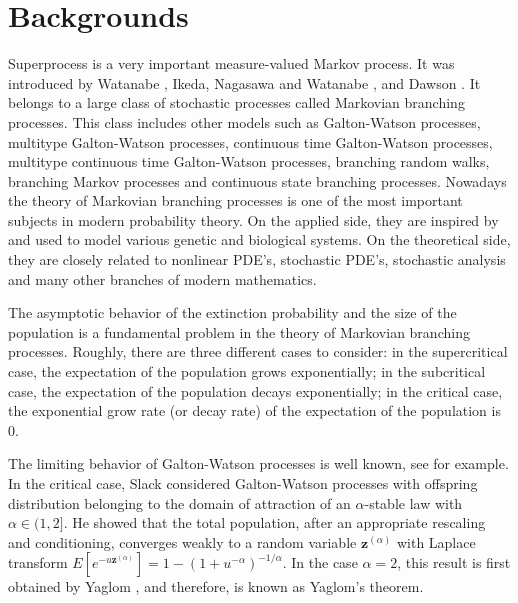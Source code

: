 \documentclass[UTF8]{pkuthss}
\theoremstyle{plain}
\theoremstyle{definition}
\numberwithin{equation}{section}
\begin{document}
\section{Backgrounds}
    Superprocess is a very important measure-valued Markov process. 
    It was introduced by Watanabe \cite{Watanabe1968A-limit}, Ikeda, Nagasawa and Watanabe \cite{IkedaNagasawaWatanabe1968Branching1,IkedaNagasawaWatanabe1968Branching2,IkedaNagasawaWatanabe1968Branching3}, and Dawson \cite{Dawson1975Stochastic,Dawson1977The-critical}. 
    It belongs to a large class of stochastic processes called Markovian branching processes. 
    This class includes other models such as Galton-Watson processes, multitype Galton-Watson processes, continuous time Galton-Watson processes, multitype continuous time Galton-Watson processes, branching random walks, branching Markov processes and continuous state branching processes.
    Nowadays the theory of Markovian branching processes is one of the most important subjects in modern probability theory.
    On the applied side, they are inspired by and used to model various genetic and biological systems. 
    On the theoretical side, they are closely related to nonlinear PDE's, stochastic PDE's, stochastic analysis and many other branches of modern mathematics.

    The asymptotic behavior of the extinction probability and the size of the population is a fundamental problem in the theory of Markovian branching processes. 
    Roughly, there are three different cases to consider: in the supercritical case, the expectation of the population grows exponentially; in the subcritical case, the expectation of the population decays exponentially; in the critical case, the exponential grow rate (or decay rate) of the expectation of the population is $0$.

    The limiting behavior of Galton-Watson processes is well known, see \cite{AthreyaNey1972Branching} for example. 
    In the critical case, Slack \cite{Slack1968A-branching} considered Galton-Watson processes with offspring distribution belonging to the domain of attraction of an $\alpha$-stable law with $\alpha \in (1,2]$. 
    He showed that the total population, after an appropriate rescaling and conditioning, converges weakly to a random variable $\mathbf z^{(\alpha)}$ with Laplace transform $E[e^{-u\mathbf z^{(\alpha)}}] = 1-(1+u^{-\alpha})^{-1/\alpha}$. 
    In the case $\alpha = 2$, this result is first obtained by Yaglom \cite{Yaglom1947Certain}, and therefore, is known as Yaglom's theorem.
    
\end{document}
